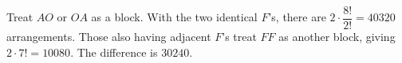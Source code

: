 Treat $AO$ or $OA$ as a block. With the two identical $F$'s, there are $2\cdot\dfrac{8!}{2!}=40320$ arrangements. Those also having adjacent $F$'s treat $FF$ as another block, giving $2\cdot7!=10080$. The difference is $\boxed{30240}$.
